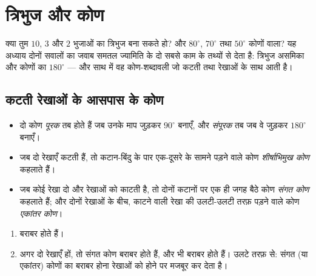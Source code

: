 \chapter{त्रिभुज और कोण}\label{ch:g7:triangles}

क्या तुम $10$, $3$ और $2$ भुजाओं का त्रिभुज बना सकते हो? और
$80^\circ$, $70^\circ$ तथा $50^\circ$ कोणों वाला? यह अध्याय दोनों
सवालों का जवाब समतल ज्यामिति के दो सबसे काम के तथ्यों से देता है:
त्रिभुज असमिका और कोणों का $180^\circ$  --- और साथ में वह
कोण-शब्दावली जो कटती तथा  रेखाओं के साथ आती है।

\section{कटती रेखाओं के आसपास के कोण}

\begin{definition}[कोणों के जोड़े]\label{def:g7:triangles:pairs}
\begin{itemize}
  \item दो कोण \emph{पूरक} तब होते हैं जब उनके माप जुड़कर
        $90^\circ$ बनाएँ, और \emph{संपूरक} तब जब वे जुड़कर
        $180^\circ$ बनाएँ।
  \item जब दो रेखाएँ कटती हैं, तो कटान-बिंदु के पार एक-दूसरे के
        सामने पड़ने वाले कोण \emph{शीर्षाभिमुख
        कोण} कहलाते हैं।
  \item जब कोई रेखा दो और रेखाओं को काटती है, तो दोनों कटानों पर
        एक ही जगह बैठे कोण \emph{संगत कोण} कहलाते हैं; और दोनों
        रेखाओं के बीच, काटने वाली रेखा की उलटी-उलटी तरफ़ पड़ने वाले
        कोण \emph{एकांतर कोण}।
\end{itemize}
\end{definition}

\begin{theorem}[कोणों की बराबरी]\label{thm:g7:triangles:equalities}
\begin{enumerate}
  \item {} बराबर होते हैं।
  \item अगर दो रेखाएँ  हों, तो संगत कोण बराबर होते हैं, और
         भी बराबर होते हैं। उलटे तरफ़ से: संगत (या
        एकांतर) कोणों का बराबर होना रेखाओं को  होने पर मजबूर
        कर देता है।
\end{enumerate}
\end{theorem}

